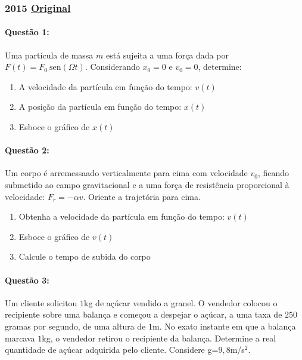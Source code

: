 \documentclass[12pt,a4paper]{article}
\newcommand{\sen}{\mathrm{sen}}
\newcommand{\original}[1]{\tiny \href{#1}{Original} \normalsize}
\begin{document}
\subsubsection{2015 \original{https://drive.google.com/file/d/1rZyPa6pyJ_EWK4032TKOE4inEr9lm_6s/view?usp=sharing}}

\paragraph{Questão 1:}

Uma partícula de massa $m$ está sujeita a uma força dada por $F(t)=F_0 \ \sen (\Omega t)$.
Considerando $x_0=0$ e $v_0=0$, determine:

\begin{enumerate}[label=\alph*)]
\item A velocidade da partícula em função do tempo: $v(t)$
\item A posição da partícula em função do tempo: $x(t)$
\item Esboce o gráfico de $x(t)$
\end{enumerate}


\paragraph{Questão 2:}

Um corpo é arremessaado verticalmente para cima com velocidade $v_0$, ficando submetido ao campo gravitacional e a uma força de resistência 
proporcional à velocidade: $F_r=-\alpha v$. Oriente a trajetória para cima.

\begin{enumerate}[label=\alph*)]
\item Obtenha a velocidade da partícula em função do tempo: $v(t)$
\item Esboce o gráfico de $v(t)$
\item Calcule o tempo de subida do corpo
\end{enumerate}

\paragraph{Questão 3:}

Um cliente solicitou $1$kg de açúcar vendido a granel. O vendedor colocou o recipiente sobre uma balança
e começou a despejar o açúcar, a uma taxa de $250$ gramas por segundo, de uma altura de $1$m. No exato instante em que a balança
marcava $1$kg, o vendedor retirou o recipiente da balança. Determine a real quantidade de açúcar adquirida pelo cliente. Considere g=$9,8$m/s$^2$.
\end{document}
